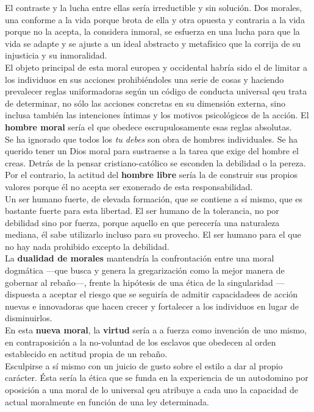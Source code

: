 \documentclass[a4paper, 10pt, twocolumn, spanish]{article}
\begin{document}
El contraste y la lucha entre ellas sería irreductible y sin
solución. Dos morales, una conforme a la vida porque brota de ella y
otra opuesta y contraria a la vida porque no la acepta, la considera
inmoral, se esfuerza en una lucha para que la vida se adapte y se
ajuste a un ideal abstracto y metafísico que la corrija de su
injusticia y su inmoralidad.\\[0pt]

El objeto principal de esta moral europea y occidental habría sido el
de limitar a los individuos en sus acciones prohibiéndoles una serie
de cosas y haciendo prevalecer reglas uniformadoras según un código de
conducta universal qeu trata de determinar, no sólo las acciones
concretas en su dimensión externa, sino inclusa también las
intenciones íntimas y los motivos psicológicos de la acción. El
\textbf{hombre moral} sería el que obedece escrupulosamente esas reglas
absolutas.\\[0pt]
Se ha ignorado que todos los \emph{tu debes} son obra de hombres
individuales. Se ha querido tener un Dios moral para sustraerse a la
tarea que exige del hombre el creas. Detrás de la pensar
cristiano-católico se esconden la debilidad o la pereza.\\[0pt]

Por el contrario, la actitud del \textbf{hombre libre} sería la de construir
sus propios valores porque él no acepta ser exonerado de esta
responsabilidad.\\[0pt]
Un ser humano fuerte, de elevada formación, que se contiene a sí
mismo, que es bastante fuerte para esta libertad. El ser humano de la
tolerancia, no por debilidad sino por fuerza, porque aquello en que
perecería una naturaleza mediana, él sabe utilizarlo incluso para su
provecho. El ser humano para el que no hay nada prohibido excepto la
debilidad.\\[0pt]

La \textbf{dualidad de morales} mantendría la confrontación entre una moral
dogmática —que busca y genera la gregarización como la mejor manera de
gobernar al rebaño—, frente la hipótesis de una ética de la
singularidad —dispuesta a aceptar el riesgo que se seguiría de admitir
capacidadees de acción nuevas e innovadoras que hacen crecer y
fortalecer a los individuos en lugar de disminuirlos.\\[0pt]

En esta \textbf{nueva moral}, la \textbf{virtud} sería a a fuerza como invención de
uno mismo, en contraposición a la no-voluntad de los esclavos que
obedecen al orden establecido en actitud propia de un rebaño.\\[0pt]
Esculpirse a sí mismo con un juicio de gusto sobre el estilo a dar al
propio carácter. Ésta sería la ética que se funda en la experiencia de
un autodomino por oposición a una moral de lo universal qeu atribuye a
cada uno la capacidad de actual moralmente en función de una ley
determinada.\\[0pt]
\end{document}
